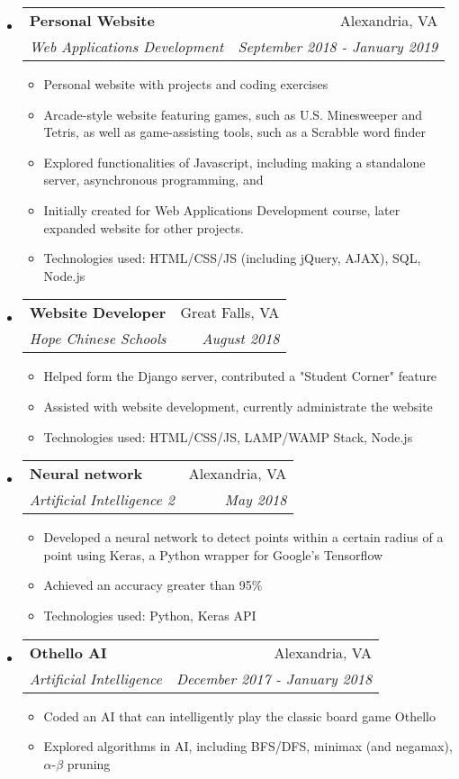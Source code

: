\documentclass[letterpaper,11pt]{article}
\makeatletter
\newcommand{\resitem}[1]{\item #1 \vspace{-2pt}}
\newcommand{\ressubheading}[4]{
\begin{tabular*}{7.0in}{l@{\extracolsep{\fill}}r}
		\textbf{#1} & #2 \\
		\textit{#3} & \textit{#4} \\
\end{tabular*}\vspace{-6pt}}
\makeatother
\begin{document}
\begin{itemize}
\item
    \ressubheading{Personal Website}{Alexandria, VA}{Web Applications Development}{September 2018 - January 2019}
	\begin{itemize}
		\resitem{Personal website with projects and coding exercises}
		\resitem{Arcade-style website featuring games, such as U.S. Minesweeper and Tetris, as well as game-assisting tools, such as a Scrabble word finder}
		\resitem{Explored functionalities of Javascript, including making a standalone server, asynchronous programming, and }
		\resitem{Initially created for Web Applications Development course, later expanded website for other projects.}
		\resitem{Technologies used: HTML/CSS/JS (including jQuery, AJAX), SQL, Node.js}
	\end{itemize}
\pagebreak
\item
    \ressubheading{Website Developer}{Great Falls, VA}{Hope Chinese Schools}{August 2018}
	\begin{itemize}
		\resitem{Helped form the Django server, contributed a "Student Corner" feature}
		\resitem{Assisted with website development, currently administrate the website}
		\resitem{Technologies used: HTML/CSS/JS, LAMP/WAMP Stack, Node.js}
	\end{itemize}
\item
    \ressubheading{Neural network}{Alexandria, VA}{Artificial Intelligence 2}{May 2018}
    \begin{itemize}
        \resitem{Developed a neural network to detect points within a certain radius of a point using Keras, a Python wrapper for Google's Tensorflow}
        \resitem{Achieved an accuracy greater than 95\%}
        \resitem{Technologies used: Python, Keras API}
    \end{itemize}
\item
    \ressubheading{Othello AI}{Alexandria, VA}{Artificial Intelligence}{December 2017 - January 2018}
    \begin{itemize}
        \resitem{Coded an AI that can intelligently play the classic board game Othello}
        \resitem{Explored algorithms in AI, including BFS/DFS, minimax (and negamax), $\alpha$-$\beta$ pruning}

\end{itemize}
\end{itemize}
\end{document}
